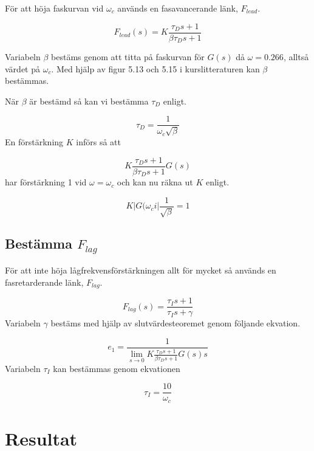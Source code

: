 \documentclass[a4paper]{article}
\begin{document}
För att höja faskurvan vid $\omega_{c}$ används en fasavancerande länk, $F_{lead}$.

\begin{equation}
  F_{lead}(s)=K\frac{\tau_{D}s+1}{\beta\tau_{D}s+1}
\end{equation}

Variabeln $\beta$ bestäms genom att titta på faskurvan för $G(s)$ då $\omega = 0.266$, alltså värdet på $\omega_c$. 
Med hjälp av figur 5.13 och 5.15 i kurslitteraturen \cite{kb} kan $\beta$ bestämmas.

När $\beta$ är bestämd så kan vi bestämma $\tau_D$ enligt.

\begin{equation}
  \tau_D=\frac{1}{\omega_c\sqrt{\beta}}
\end{equation}
En förstärkning $K$ införs så att 

\begin{equation}
  K\frac{\tau_Ds+1}{\beta\tau_Ds+1}G(s)
\end{equation}
har förstärkning 1 vid $\omega = \omega_c$ och kan nu räkna ut $K$ enligt.

\begin{equation}
  K|G(\omega_ci|\frac{1}{\sqrt{\beta}}=1
\end{equation}

\subsection{Bestämma $F_{lag}$}

För att inte höja lågfrekvensförstärkningen allt för mycket så används en fasretarderande länk, $F_{lag}$.

\begin{equation}
  F_{lag}(s)=\frac{\tau_Is+1}{\tau_Is+\gamma}
\end{equation}
Variabeln $\gamma$ bestäms med hjälp av slutvärdesteoremet genom följande ekvation.

\begin{equation}
  e_1=\frac{1}{\lim_{s \to 0}K\frac{\tau_Ds+1}{\beta\tau_Ds+1}G(s)s}
\end{equation}
Variabeln $\tau_I$ kan bestämmas genom ekvationen

\begin{equation}
  \tau_I=\frac{10}{\omega_c}
\end{equation}

\section{Resultat}
\end{document}
